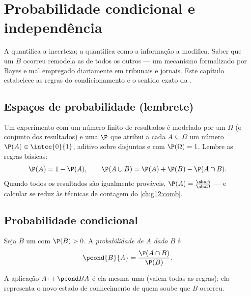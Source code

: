 \chapter{Probabilidade condicional e independência}\label{ch:g12:condprob}

A  quantifica a incerteza; a 
quantifica como a informação a modifica. Saber que um  $B$ ocorreu
remodela as  de todos os outros  --- um mecanismo
formalizado por Bayes e mal empregado diariamente em tribunais e jornais.
Este capítulo estabelece as regras do condicionamento e o sentido exato da
.

\section{Espaços de probabilidade (lembrete)}

Um experimento com um número finito de resultados é modelado por um
\emph{} $\Omega$ (o conjunto dos resultados) e uma
 $\P$ que atribui a cada  $A \subseteq \Omega$ um
número $\P(A) \in \intcc{0}{1}$, aditivo sobre  disjuntas e com
$\P(\Omega) = 1$. Lembre as regras básicas:
\[
\P(\bar A) = 1 - \P(A),
\qquad
\P(A \cup B) = \P(A) + \P(B) - \P(A \cap B).
\]
Quando todos os resultados são igualmente prováveis,
$\P(A) = \frac{\abs A}{\abs\Omega}$ --- e calcular  se reduz
às técnicas de contagem do \cref{ch:g12:comb}.

\section{Probabilidade condicional}

\begin{definition}\label{def:g12:condprob:cond}
Seja $B$ um  com $\P(B) > 0$. A \emph{probabilidade de $A$ dado
$B$} é
\[
\pcond{B}{A} = \frac{\P(A \cap B)}{\P(B)} .
\]
\end{definition}

A aplicação $A \mapsto \pcond BA$ é ela mesma uma  (valem
todas as regras); ela representa o novo estado de conhecimento de quem
soube que $B$ ocorreu.

